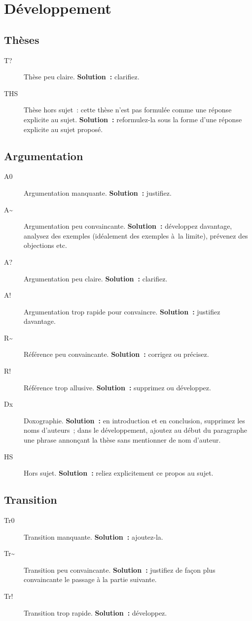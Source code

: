 \documentclass[a4paper,11pt]{article}
\begin{document}
\section{Développement}
\label{sec:org3367313}

\subsection{Thèses}
\label{sec:orgaa32012}
\begin{description}
\item[{T\string?}] Thèse peu claire. \textbf{Solution :} clarifiez.
\item[{THS}] Thèse hors sujet : cette thèse n'est pas formulée comme une
réponse explicite au sujet. \textbf{Solution :} reformulez-la sous la forme
d'une réponse explicite au sujet proposé.
\end{description}

\subsection{Argumentation}
\label{sec:org4858fbd}
\begin{description}
\item[{A0}] Argumentation manquante. \textbf{Solution :} justifiez.
\item[{A\textasciitilde{}}] Argumentation peu convaincante. \textbf{Solution :} développez
davantage, analysez des exemples (idéalement des exemples à la
limite), prévenez des objections etc.
\item[{A\string?}] Argumentation peu claire. \textbf{Solution :} clarifiez.
\item[{A\string!}] Argumentation trop rapide pour convaincre. \textbf{Solution :}
justifiez davantage.
\item[{R\textasciitilde{}}] Référence peu convaincante. \textbf{Solution :} corrigez ou précisez.
\item[{R\string!}] Référence trop allusive. \textbf{Solution :} supprimez ou développez.
\item[{Dx}] Doxographie. \textbf{Solution :} en introduction et en conclusion,
supprimez les noms d'auteurs ; dans le développement, ajoutez au début
du paragraphe une phrase annonçant la thèse sans mentionner de nom
d'auteur.
\item[{HS}] Hors sujet. \textbf{Solution :} reliez explicitement ce propos au
sujet.
\end{description}

\subsection{Transition}
\label{sec:orgdd97ea6}
\begin{description}
\item[{Tr0}] Transition manquante. \textbf{Solution :} ajoutez-la.
\item[{Tr\textasciitilde{}}] Transition peu convaincante. \textbf{Solution :} justifiez de façon
plus convaincante le passage à la partie suivante.
\item[{Tr\string!}] Transition trop rapide. \textbf{Solution :} développez.
\end{description}
\end{document}
